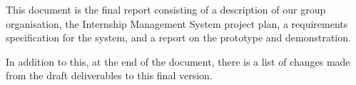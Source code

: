 This document is the final report consisting of a description of our group
organisation, the Internship Management System project plan, a requirements
specification for the system, and a report on the prototype and demonstration.

In addition to this, at the end of the document, there is a list of changes
made from the draft deliverables to this final version.
